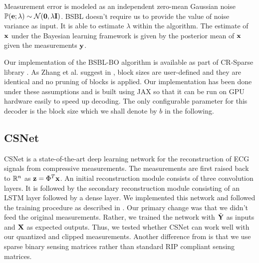 Measurement error is modeled as an independent zero-mean Gaussian
noise $\mathbb{P}(\mathbf{e}; \lambda) \sim \mathcal{N}(\mathbf{0}, \lambda \mathbf{I})$.
BSBL doesn't require us to provide the value of noise variance
as input.
It is able to estimate $\lambda$ within the algorithm.
The estimate of $\mathbf{x}$ under the Bayesian learning framework
is given by the posterior mean of $\mathbf{x}$ given the measurements $\mathbf{y}$.

Our implementation of the BSBL-BO algorithm is available as part of
CR-Sparse library \cite{kumar2021cr}.
As Zhang et al. suggest in \cite{zhang2012compressed},
block sizes are user-defined and they are identical and
no pruning of blocks is applied. Our implementation has been
done under these assumptions and is built using JAX so that it can
be run on GPU hardware easily to speed up decoding.
The only configurable parameter for this decoder is the block size
which we shall denote by $b$ in the following.

\subsection{CSNet}

CSNet \cite{zhang2021csnet} is a state-of-the-art deep learning network
for the reconstruction of ECG signals from compressive
measurements. The measurements are first raised back
to $\mathbb{R}^n$ as $\mathbf{z} = \Phi^T \mathbf{x}$. 
An initial reconstruction module consists of three convolution
layers. It is followed by the secondary reconstruction module
consisting of an LSTM layer followed by a dense layer.
We implemented this network and followed the training procedure
as described in \cite{zhang2021csnet}.
Our primary change was that we didn't feed the original
measurements.
Rather, we trained the network with $\tilde{\mathbf{Y}}$
as inputs and $\mathbf{X}$ as expected outputs.
Thus, we tested whether CSNet can work well with our
quantized and clipped measurements. 
Another difference from \cite{zhang2021csnet} is that
we use sparse binary sensing matrices rather than standard RIP compliant
sensing matrices.

